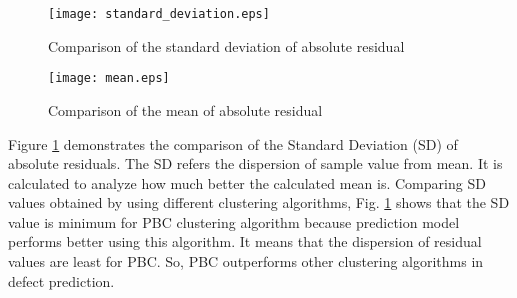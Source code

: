 \documentclass[12pt]{report}
\begin{document}
 \begin{figure}[h!]
  \centering
    \texttt{[image: standard\_deviation.eps]}
		\caption{Comparison of the standard deviation of absolute residual}
		\label{StandardDeviation}
\end{figure}


\begin{figure}[h!]
\centering
     \texttt{[image: mean.eps]}
		 \caption{Comparison of the mean of absolute residual}
		\label{MeanAbsoluteResidual}
\end{figure}

%

Figure \ref{StandardDeviation} demonstrates the comparison of the Standard Deviation (SD) of absolute residuals. The SD refers the dispersion of sample value from mean. It is calculated to analyze how much better the calculated mean is. Comparing SD values obtained by using different clustering algorithms, Fig. \ref{StandardDeviation} shows that the SD value is minimum for PBC clustering algorithm because prediction model performs better using this algorithm. It means that the dispersion of residual values are least for PBC. So, PBC outperforms other clustering algorithms in defect prediction.   
\end{document}
